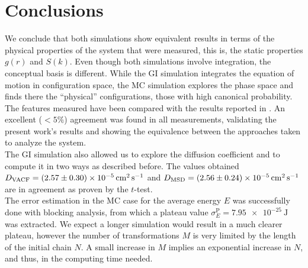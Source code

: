 \documentclass[%
aps,
pra,%
amsmath,amssymb,
preprint,%
reprint,%
notitlepage,
a4paper]{revtex4-1}
\begin{document}
\section{Conclusions\label{sec:conclusions}}
We conclude that both simulations show equivalent results in terms of the physical properties of the system that were measured, this is, the static properties $g(r)$ and $S(k)$. Even though both simulations involve integration, the conceptual basis is different. While the GI simulation integrates the equation of motion in configuration space, the MC simulation explores the phase space and finds there the ``physical'' configurations, those with high canonical probability.\\
The features measured have been compared with the results reported in \citet{Rahman1964}. An excellent ($<5\%$) agreement was found in all measurements, validating the present work's results and showing the equivalence between the approaches taken to analyze the system.\\
The GI simulation also allowed us to explore the diffusion coefficient and to compute it in two ways as described before. The values obtained $D_\mathrm{VACF} = \SI{2,57 \pm 0.3e-5}{\square\centi\meter\per\second}$ and $D_{\mathrm{MSD}} = \SI{2.56 \pm 0.24 e-5}{\square\centi\meter\per\second}$ are in agreement as proven by the $t$-test.\\
The error estimation in the MC case for the average energy $E$ was successfully done with blocking analysis, from which a plateau value $\sigma_E^\mathrm{P} = \SI{7.95e-25}{\joule}$ was extracted. We expect a longer simulation would result in a much clearer plateau, however the number of transformations $M$ is very limited by the length of the initial chain $N$. A small increase in $M$ implies an exponential increase in $N$, and thus, in the computing time needed.




	
\end{document}
